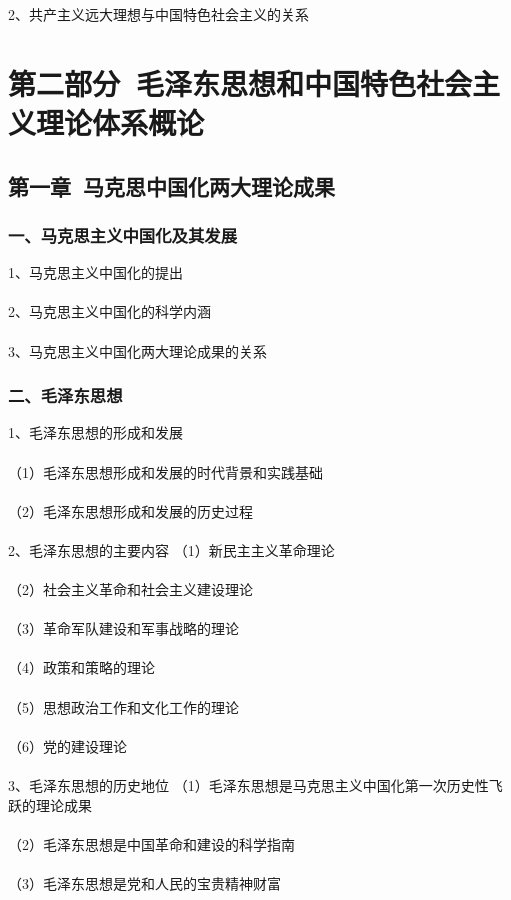 \documentclass{ctexart}
\begin{document}
2、共产主义远大理想与中国特色社会主义的关系


\section{第二部分\ 毛泽东思想和中国特色社会主义理论体系概论}
\subsection{第一章\ 马克思中国化两大理论成果}
\subsubsection{一、马克思主义中国化及其发展}
1、马克思主义中国化的提出
\\\\

2、马克思主义中国化的科学内涵
\\\\

3、马克思主义中国化两大理论成果的关系

\subsubsection{二、毛泽东思想}
1、毛泽东思想的形成和发展
\\\\
（1）毛泽东思想形成和发展的时代背景和实践基础
\\\\
（2）毛泽东思想形成和发展的历史过程
\\\\

2、毛泽东思想的主要内容
（1）新民主主义革命理论
\\\\
（2）社会主义革命和社会主义建设理论
\\\\
（3）革命军队建设和军事战略的理论
\\\\
（4）政策和策略的理论
\\\\
（5）思想政治工作和文化工作的理论
\\\\
（6）党的建设理论
\\\\

3、毛泽东思想的历史地位
（1）毛泽东思想是马克思主义中国化第一次历史性飞跃的理论成果
\\\\
（2）毛泽东思想是中国革命和建设的科学指南
\\\\
（3）毛泽东思想是党和人民的宝贵精神财富
\end{document}
